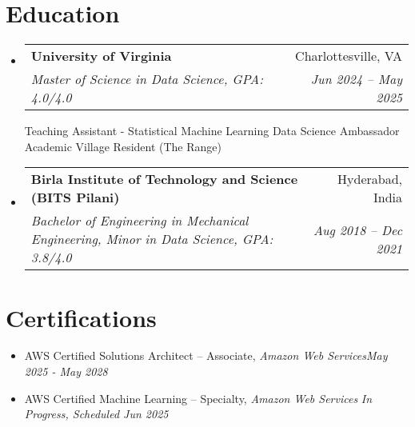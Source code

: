 \documentclass[letterpaper,11pt]{article}
\makeatletter
\newcommand{\resumeItem}[1]{
\justifying
  \item{\small{#1}}
  \vspace{-2px}
}
\newcommand{\resumeSubheading}[4]{
  \item
    \begin{tabular*}{1\textwidth}{l@{\extracolsep{\fill}}r}
      \textbf{\large{#1}} & {\small{#2}} \\
      {\textsl{{#3}}} & {\textsl{\small{#4}}}
    \end{tabular*}
  \vspace{-0.5cm}
}
\newcommand{\resumeSubHeadingListStart}{\begin{itemize}[leftmargin=0.0in, label={}]}
\newcommand{\resumeSubHeadingListEnd}{\end{itemize}}
\newcommand{\resumeItemListStart}{
  \vspace{-5pt}
  \begin{itemize}[leftmargin=0.21in, label=\textbullet]
}
\newcommand{\resumeItemListEnd}{\end{itemize}}
\makeatother
\begin{document}
\vspace{-16pt}
\section{\Large{Education}}
\vspace{3pt}
\resumeSubHeadingListStart

\resumeSubheading
    {University of Virginia}{Charlottesville, VA}
    {Master of Science in Data Science, GPA: 4.0/4.0}{Jun 2024 -- May 2025}

\vspace{6px}
\footnotesize{
Teaching Assistant - Statistical Machine Learning {\textbullet}
Data Science Ambassador {\textbullet}
Academic Village Resident (The Range)\\




}



\resumeSubHeadingListEnd
\vspace{-8pt}
\resumeSubHeadingListStart
\resumeSubheading
    {Birla Institute of Technology and Science \normalsize{(BITS Pilani)}}{Hyderabad, India}
    {Bachelor of Engineering in Mechanical Engineering, Minor in Data Science, GPA: 3.8/4.0}{Aug 2018 -- Dec 2021}

\resumeSubHeadingListEnd




\vspace{-9pt}
\section{\Large{Certifications}}
\vspace{9pt}
\resumeItemListStart

\resumeItem{AWS Certified Solutions Architect – Associate, \textsl{Amazon Web Services}\hfill\sl{May 2025 - May 2028}}

\resumeItem{\vspace{-8pt}AWS Certified Machine Learning – Specialty, \textsl{Amazon Web Services} \hfill\sl{In Progress, Scheduled Jun 2025}}

\resumeItemListEnd
\end{document}
